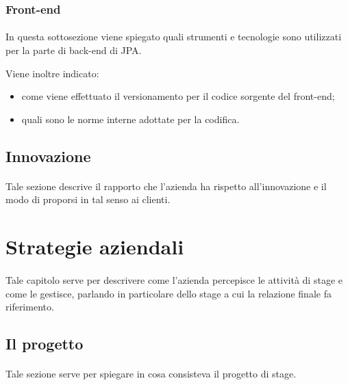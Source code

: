 \documentclass[
article,
10pt, %
oneside, %
BCOR5mm, %
]{scrartcl}
\begin{document}
\subsubsection{Front-end}

\paragraph{} In questa sottosezione viene spiegato quali strumenti e
tecnologie sono utilizzati per la parte di back-end di JPA.

Viene inoltre indicato:

\begin{itemize}
\item come viene effettuato il versionamento per il codice sorgente del
  front-end;
\item quali sono le norme interne adottate per la codifica.
\end{itemize}

\subsection{Innovazione}

\paragraph{} Tale sezione descrive il rapporto che l'azienda ha rispetto
all'innovazione e il modo di proporsi in tal senso ai clienti.



\section{Strategie aziendali} %

\paragraph{} Tale capitolo serve per descrivere come l'azienda percepisce le
attività di stage e come le gestisce, parlando in particolare dello stage a
cui la relazione finale fa riferimento.

\subsection{Il progetto}

\paragraph{} Tale sezione serve per spiegare in cosa consisteva il progetto
di stage.
\end{document}
